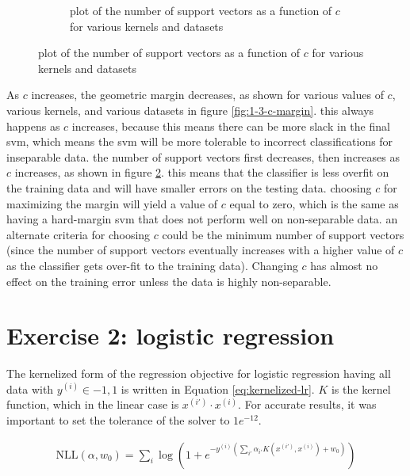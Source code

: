 \documentclass[10pt]{article}
\begin{document}
\begin{figure}[!ht]
\begin{subfigure}[b]{0.46\textwidth}
	\caption{plot of the number of support vectors as a function of $c$ for various kernels and datasets}
	\label{fig:1-3-support-vectors}
\end{subfigure}
\end{figure}

As $c$ increases, the geometric margin decreases, as shown for various values of $c$, various kernels, and various datasets in figure \ref{fig:1-3-c-margin}. this always happens as $c$ increases, because this means there can be more slack in the final svm, which means the svm will be more tolerable to incorrect classifications for inseparable data. the number of support vectors first decreases, then increases as $c$ increases, as shown in figure \ref{fig:1-3-support-vectors}. this means that the classifier is less overfit on the training data and will have smaller errors on the testing data. choosing $c$ for maximizing the margin will yield a value of $c$ equal to zero, which is the same as having a hard-margin svm that does not perform well on non-separable data. an alternate criteria for choosing $c$ could be the minimum number of support vectors (since the number of support vectors eventually increases with a higher value of $c$ as the classifier gets over-fit to the training data). Changing $c$ has almost no effect on the training error unless the data is highly non-separable.

\section{Exercise 2: logistic regression}

The kernelized form of the regression objective for logistic regression having all data with $y^{(i)} \in {-1, 1}$ is written in Equation \ref{eq:kernelized-lr}. $K$ is the kernel function, which in the linear case is $x^{(i')} \cdot x^{(i)}$. For accurate results, it was important to set the tolerance of the solver to $1e^{-12}$.

\begin{subequations}
	\begin{align}
		\text{NLL}(\alpha, w_0) = \sum_i \log \left(1 + e^{-y^{(i)}\left(\displaystyle\sum_{i'} \alpha_{i'} K(x^{(i')}, x^{(i)}) + w_0\right)}\right)
	\end{align}
	\label{eq:kernelized-lr}
\end{subequations}

\end{document}
